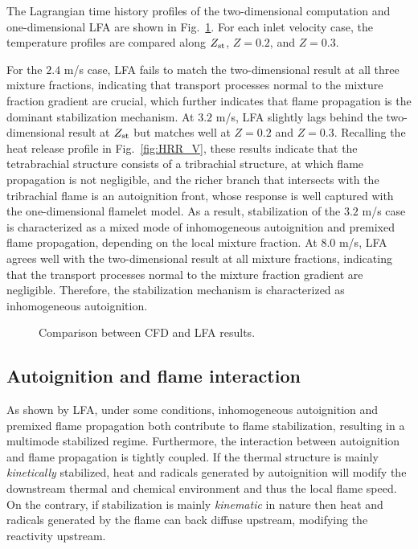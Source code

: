 \documentclass[review,3p,times]{elsarticle}
\begin{document}
The Lagrangian time history profiles of the two-dimensional computation and one-dimensional LFA are shown in Fig.~\ref{fig:LFA_V}.  For each inlet velocity case, the temperature profiles are compared along $Z_{\rm st}$, $Z = 0.2$, and $Z = 0.3$.

For the $2.4$ m/s case, LFA fails to match the two-dimensional result at all three mixture fractions, indicating that transport processes normal to the mixture fraction gradient are crucial, which further indicates that flame propagation is the dominant stabilization mechanism.  At $3.2$ m/s, LFA slightly lags behind the two-dimensional result at $Z_{\rm st}$ but matches well at $Z = 0.2$ and $Z = 0.3$.  Recalling the heat release profile in Fig.~\ref{fig:HRR_V}, these results indicate that the tetrabrachial structure consists of a tribrachial structure, at which flame propagation is not negligible, and the richer branch that intersects with the tribrachial flame is an autoignition front, whose response is well captured with the one-dimensional flamelet model.  As a result, stabilization of the $3.2$ m/s case is characterized as a mixed mode of inhomogeneous autoignition and premixed flame propagation, depending on the local mixture fraction.  At $8.0$ m/s, LFA agrees well with the two-dimensional result at all mixture fractions, indicating that the transport processes normal to the mixture fraction gradient are negligible.  Therefore, the stabilization mechanism is characterized as inhomogeneous autoignition.

\begin{figure}
  \centering
  \scriptsize
  \resizebox{1.0\textwidth}{!}{}
  \normalsize
  \vspace{-0.2in}
  \caption{Comparison between CFD and LFA results.}
  \label{fig:LFA_V}
\end{figure}

\subsection{Autoignition and flame interaction}

As shown by LFA, under some conditions, inhomogeneous autoignition and premixed flame propagation both contribute to flame stabilization, resulting in a multimode stabilized regime.  Furthermore, the interaction between autoignition and flame propagation is tightly coupled.  If the thermal structure is mainly \emph{kinetically} stabilized, heat and radicals generated by autoignition will modify the  downstream thermal and chemical environment and thus the local flame speed.  On the contrary, if stabilization is mainly \emph{kinematic} in nature then heat and radicals generated by the flame can back diffuse upstream, modifying the reactivity upstream.  
\end{document}
